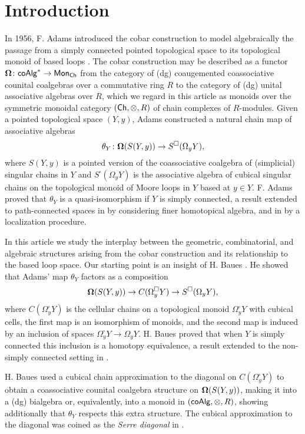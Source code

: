 
\section{Introduction}

In 1956, F. Adams introduced the cobar construction to model algebraically the passage from a simply connected pointed topological space to its topological monoid of based loops \cite{Adams}. The cobar construction may be described as a functor $\mathbf{\Omega} \colon \mathsf{coAlg}^* \to \mathsf{Mon}_{\mathsf{Ch}}$ from the category of (dg) coaugemented coassociative counital coalgebras over a commutative ring $R$ to the category of (dg) unital associative algebras over $R$, which we regard in this article as monoids over the symmetric monoidal category $(\mathsf{Ch}, \otimes, R) $ of chain complexes of $R$-modules. Given a pointed topological space $(Y, y)$, Adams constructed a natural chain map of associative algebras
\begin{equation*}
\theta_Y \colon \mathbf{\Omega}(S(Y, y)) \to S^{\square}(\Omega_y Y),
\end{equation*}
where $S(Y,y)$ is a pointed version of the coassociative coalgebra of (simplicial) singular chains in $Y$ and $S^{\square}(\Omega_yY)$ is the associative algebra of cubical singular chains on the topological monoid of Moore loops in $Y$ based at $y \in Y$.
F. Adams proved that $\theta_Y$ is a quasi-isomorphism if $Y$ is simply connected, a result extended to path-connected spaces in \cite{rivera-zeinalian-cubical} by considering finer homotopical algebra, and in \cite{Hess-Tonks} by a localization procedure.

In this article we study the interplay between the geometric, combinatorial, and algebraic structures arising from the cobar construction and its relationship to the based loop space.
Our starting point is an insight of H. Baues \cite{Baues}.
He showed that Adams' map $\theta_Y$ factors as a composition
$$\mathbf{\Omega}(S(Y,y)) \to C(\Omega^{\square}_yY) \to S^{\square}(\Omega_yY),$$
where $C(\Omega^{\square}_yY)$ is the cellular chains on a topological monoid $\Omega^{\square}_yY$ with cubical cells, the first map is an isomorphism of monoids, and the second map is induced by an inclusion of spaces $\Omega^{\square}_yY \to \Omega_yY$.
H. Baues proved that when $Y$ is simply connected this inclusion is a homotopy equivalence, a result extended to the non-simply connected setting in \cite{Rivera-Saneblidze}. 

H. Baues used a cubical chain approximation to the diagonal on $C(\Omega^{\square}_yY)$ to obtain a coassociative counital coalgebra structure on $\mathbf{\Omega}(S(Y,y))$, making it into a (dg) bialgebra or, equivalently, into a monoid in $(\mathsf{coAlg}, \otimes, R)$, showing additionally that $\theta_Y$ respects this extra structure. The cubical approximation to the diagonal was coined as the \textit{Serre diagonal} in \cite{Kadeishvili-Saneblidze}.

